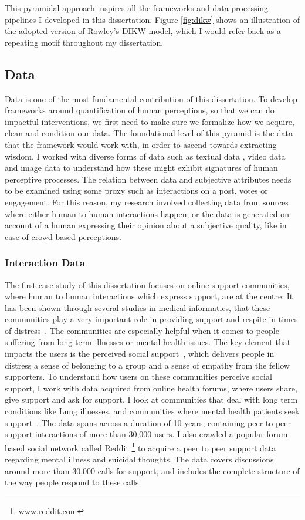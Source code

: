 This pyramidal approach inspires all the frameworks and data processing pipelines I developed in this dissertation. Figure \ref{fig:dikw} shows an illustration of the adopted version of Rowley's DIKW model, which I would refer back as a repeating motif throughout my dissertation.

\subsection{Data}
Data is one of the most fundamental contribution of this dissertation. To develop frameworks around quantification of human perceptions, so that we can do impactful interventions, we first need to make sure we formalize how we acquire, clean and condition our data. The foundational level of this pyramid is the data that the framework would work with, in order to ascend towards extracting wisdom. I worked with diverse forms of data such as textual data , video data and image data to understand how these might exhibit signatures of human perceptive processes. The relation between data and subjective attributes needs to be examined using some proxy such as interactions on a post, votes or engagement. For this reason, my research involved collecting data from sources where either human to human interactions happen, or the data is generated on account of a human expressing their opinion about a subjective quality, like in case of crowd based perceptions.

\subsubsection{Interaction Data}
The first case study of this dissertation focuses on online support communities, where human to human interactions which express support, are at the centre. It has been shown through several studies in medical informatics, that these communities play a very important role in providing support and respite in times of distress~\cite{allen2016long,mo2012developing,pendry2015individual,bartlett2011investigation,izuka2017stroke,hobbs2016online}. The communities are especially helpful when it comes to people suffering from long term illnesses or mental health issues.
The key element that impacts the users is the perceived social support~\cite{nambisan2011information}, which delivers people in distress a sense of belonging to a group and a sense of empathy from the fellow supporters. 
To understand how users on these communities perceive social support, I work with data acquired from online health forums, where users share, give support and ask for support. I look at communities that deal with long term conditions like Lung illnesses, and communities where mental health patients seek support~\cite{joglekar2018online}. The data spans across a duration of 10 years, containing peer to peer support interactions of more than 30,000 users. I also crawled a popular forum based social network called Reddit \footnote{\url{www.reddit.com}} to acquire a peer to peer support data regarding mental illness and suicidal thoughts. The data covers discussions around  more than 30,000 calls for support, and includes the complete structure of the way people respond to these calls. 

